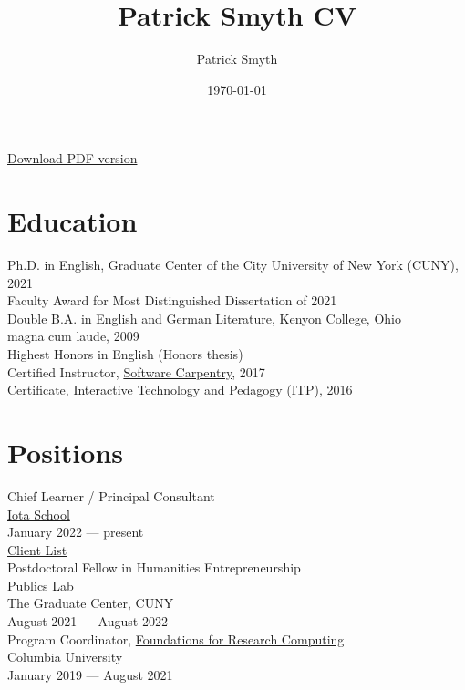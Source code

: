 \documentclass[11pt]{article}
\author{Patrick Smyth}
\date{\today}
\title{Patrick Smyth CV}
\begin{document}
\maketitle
\href{https://github.com/smythp/cv/raw/master/cv.pdf}{Download PDF version}\\
\section*{Education}
\label{sec:orgheadline1}
Ph.D. in English, Graduate Center of the City University of New York (CUNY), 2021\\
    Faculty Award for Most Distinguished Dissertation of 2021\\



Double B.A. in English and German Literature, Kenyon College, Ohio\\
        magna cum laude, 2009\\
        Highest Honors in English (Honors thesis)\\

Certified Instructor, \href{https://software-carpentry.org/about/}{Software Carpentry}, 2017\\

Certificate, \href{https://www.gc.cuny.edu/Page-Elements/Academics-Research-Centers-Initiatives/Certificate-Programs/Interactive-Technology-and-Pedagogy}{Interactive Technology and Pedagogy (ITP)}, 2016\\

\section*{Positions}
\label{sec:orgheadline3}

Chief Learner / Principal Consultant\\
\href{https://iotaschool.com/\%0A}{Iota School}\\
January 2022 — present\\
\hyperref[sec:orgheadline2]{Client List}\\

Postdoctoral Fellow in Humanities Entrepreneurship\\
\href{https://publicslab.gc.cuny.edu/\%0A}{Publics Lab}\\
The Graduate Center, CUNY\\
August 2021 — August 2022\\

Program Coordinator, \href{https://rcfoundations.research.columbia.edu/}{Foundations for Research Computing}\\
Columbia University\\
January 2019 — August 2021\\
\end{document}
